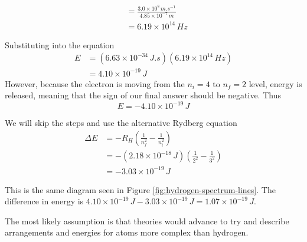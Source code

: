 \begin{solutions}
\begin{enum-alph}
\begin{align*}
                       &=\frac{3.0\times10^8\,\si{m.s^{-1}}}{4.85\times10^{-7}\,\si{m}}\\
                       &=6.19\times10^{14}\,\si{Hz}
                \end{align*}
            \item Substituting into the equation
                \begin{align*}
                    E&=(6.63\times10^{-34}\,\si{J.s})(6.19\times10^{14}\,\si{Hz})\\
                     &=4.10\times10^{-19}\,\si{J}
                \end{align*}
                However, because the electron is moving from the $n_i=4$ to $n_f=2$ level, energy is released,
                meaning that the sign of our final answer should be negative. Thus
                \[
                    E=-4.10\times10^{-19}\,\si{J}
                \]
            \item We will skip the steps and use the alternative Rydberg equation
                \begin{align*}
                    \Delta E&=-R_H\left(\frac{1}{n_f^2}-\frac{1}{n_i^2}\right)\\
                            &=-(2.18\times10^{-18}\,\si{J})\left(\frac{1}{2^2}-\frac{1}{3^2}\right)\\
                            &=-3.03\times10^{-19}\,\si{J}
                \end{align*}
            \item This is the same diagram seen in Figure \ref{fig:hydrogen-spectrum-lines}. The difference
                in energy is $4.10\times10^{-19}\,\si{J}-3.03\times10^{-19}\,\si{J}=1.07\times10^{-19}\,\si{J}$.
        \end{enum-alph}
    \item The most likely assumption is that theories would advance to try and describe arrangements
        and energies for atoms more complex than hydrogen.
\end{solutions}
